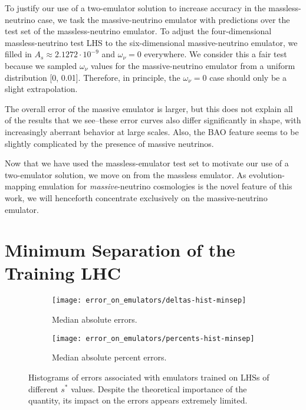 To justify our use of a two-emulator solution to increase
accuracy in the massless-neutrino case, we task the massive-neutrino emulator 
with predictions over the test set of the massless-neutrino emulator.
To adjust the four-dimensional massless-neutrino test LHS to
the six-dimensional massive-neutrino emulator, we filled in
$A_s \approx 2.1272 \cdot 10^{-9}$ and $\omega_\nu = 0$ everywhere.
We consider
this a fair test because we sampled $\omega_\nu$ values for the
massive-neutrino emulator from a uniform distribution [0, 0.01]. Therefore,
in principle, the $\omega_\nu = 0$ case should only be a slight extrapolation.

The overall error of the massive emulator is larger, but this does not
explain all of the results that we see--these error curves also differ
significantly in shape, with increasingly aberrant behavior at large scales.
Also, the BAO feature seems to be slightly complicated by the presence of
massive neutrinos.

Now that we have used the massless-emulator test set to motivate our use of
a two-emulator solution, we move on from the massless emulator.
As evolution-mapping emulation for \textit{massive}-neutrino cosmologies
is the novel feature of this work, we will henceforth concentrate exclusively
on the massive-neutrino emulator.

\section{Minimum Separation of the Training LHC}
\label{sec: error_from_lhc}

\begin{figure}[ht!]
    \begin{subfigure}{0.35 \textheight}
    \centering
 		\texttt{[image: error\_on\_emulators/deltas-hist-minsep]}
 		\caption{Median absolute errors.}
 		\label{fig: minsep_experiment_deltas}
    \end{subfigure}
    \begin{subfigure}{0.35 \textheight}
    \centering
 		\texttt{[image: error\_on\_emulators/percents-hist-minsep]}
 		\caption{Median absolute percent errors.}
 		\label{fig: minsep_experiment_percerr}
    \end{subfigure}
        \centering
    \caption[Impact of $s^*$ on Accuracy]
    		{Histograms of errors associated with emulators trained on LHSs of
    			different $s^*$ values. Despite the theoretical importance of
    			the quantity, its impact on the errors appears extremely limited.}
    \label{fig: minsep_experiment}
\end{figure}

